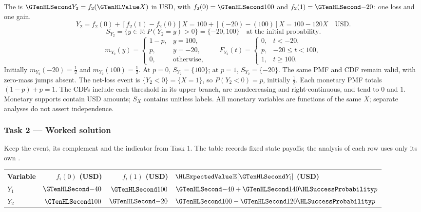 The  is $\Money{Y_2}=f_2(\Indicator{X})$ in USD,
with $f_2(0)=\Money{100}$ and $f_2(1)=\Money{-20}$: one loss and one gain.
\[
Y_2=f_2(0)+[f_2(1)-f_2(0)]X=100+[(-20)-(100)]X=100-120X\quad\text{USD}.
\]
\[S_{Y_2}=\{y\in\mathbb R:P(Y_2=y)>0\}=\{-20,100\}\quad\text{at the initial probability}.\]
\[
m_{Y_2}(y)=\begin{cases}1-p,&y=100,\\p,&y=-20,\\0,&\text{otherwise},\end{cases}
\qquad F_{Y_2}(t)=\begin{cases}0,&t<-20,\\p,&-20\leq t<100,\\1,&t\geq 100.\end{cases}
\]
Initially $m_{Y_2}(-20)=\frac{1}{2}$ and $m_{Y_2}(100)=\frac{1}{2}$.
At $p=0$, $S_{Y_2}=\{100\}$; at $p=1$, $S_{Y_2}=\{-20\}$.
The same PMF and CDF remain valid, with zero-mass jumps absent.
The net-loss event is $\{Y_2<0\}=\{X=1\}$, so $P(Y_2<0)=p$,
initially $\frac{1}{2}$.
Each monetary PMF totals $(1-p)+p=1$. The CDFs include each threshold
in its upper branch, are nondecreasing and right-continuous, and tend to 0 and 1.
Monetary supports contain USD amounts; $S_X$ contains unitless labels.
All monetary variables are functions of the same $X$; separate analyses do not assert independence.
\clearpage\subsubsection*{Task 2 --- Worked solution}\label{sol:c3-coffee-decision}
Keep the event, its complement and the indicator from Task 1.
The table records fixed state payoffs; the analysis of each row uses only its own .
\begin{center}\begin{tabular}{lrrl}\toprule
Variable & $f_i(0)$ (USD) & $f_i(1)$ (USD) & $\ExpectedValue{\mathbb E}[\Money{Y_i}]$ (USD)\\\midrule
$Y_1$ & $\Money{-40}$ & $\Money{100}$ & $\Money{-40}+\Money{140}\SuccessProb{p}$\\
$Y_2$ & $\Money{100}$ & $\Money{-20}$ & $\Money{100}-\Money{120}\SuccessProb{p}$\\
\bottomrule\end{tabular}\end{center}
